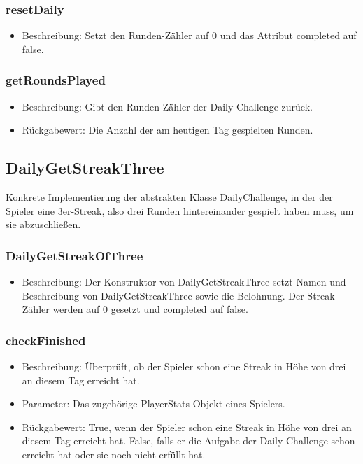 \documentclass[a4paper]{scrreprt}
\begin{document}
	\subsubsection{resetDaily}
	\begin{itemize}
		\item Beschreibung: Setzt den Runden-Zähler auf 0 und das Attribut completed auf false.
	\end{itemize}
	\subsubsection{getRoundsPlayed}
	\begin{itemize}
		\item Beschreibung: Gibt den Runden-Zähler der Daily-Challenge zurück.
		\item Rückgabewert: Die Anzahl der am heutigen Tag gespielten Runden.
	\end{itemize}

	\subsection{DailyGetStreakThree}
	Konkrete Implementierung der abstrakten Klasse DailyChallenge, in der der Spieler eine 3er-Streak, also drei Runden hintereinander gespielt haben muss, um sie abzuschließen.
	\subsubsection{DailyGetStreakOfThree}
	\begin{itemize}
		\item Beschreibung: Der Konstruktor von DailyGetStreakThree setzt Namen und Beschreibung von DailyGetStreakThree sowie die Belohnung. Der Streak-Zähler werden auf 0 gesetzt und completed auf false.
	\end{itemize}
	\subsubsection{checkFinished}
	\begin{itemize}
		\item Beschreibung: Überprüft, ob der Spieler schon eine Streak in Höhe von drei an diesem Tag erreicht hat.
		\item Parameter: Das zugehörige PlayerStats-Objekt eines Spielers.
		\item Rückgabewert: True, wenn der Spieler schon eine Streak in Höhe von drei an diesem Tag erreicht hat. False, falls er die Aufgabe der Daily-Challenge schon erreicht hat oder sie noch nicht erfüllt hat.
	\end{itemize}
\end{document}
